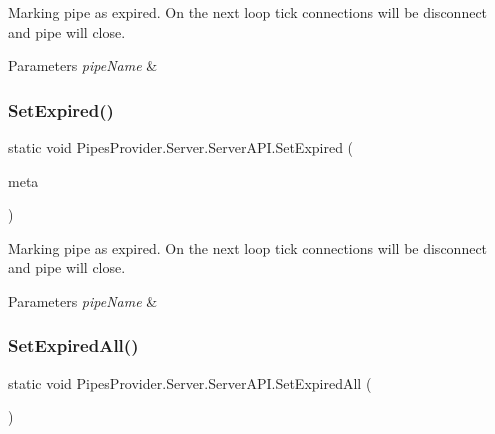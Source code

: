 Marking pipe as expired. On the next loop tick connections will be disconnect and pipe will close. 


\begin{DoxyParams}{Parameters}
{\em pipe\+Name} & \\
\hline
\end{DoxyParams}
\mbox{\label{class_pipes_provider_1_1_server_1_1_server_a_p_i_a9adcab99d6a6b7e4185203afb74dc575}} 
\subsubsection{\texorpdfstring{Set\+Expired()}{SetExpired()}\hspace{0.1cm}{\footnotesize\ttfamily [2/2]}}
{\footnotesize\ttfamily static void Pipes\+Provider.\+Server.\+Server\+A\+P\+I.\+Set\+Expired (\begin{DoxyParamCaption}\item[{\mbox{\hyperlink{class_pipes_provider_1_1_server_1_1_transmission_controllers_1_1_base_server_transmission_controller}{Base\+Server\+Transmission\+Controller}}}]{meta }\end{DoxyParamCaption})\hspace{0.3cm}{\ttfamily [static]}}



Marking pipe as expired. On the next loop tick connections will be disconnect and pipe will close. 


\begin{DoxyParams}{Parameters}
{\em pipe\+Name} & \\
\hline
\end{DoxyParams}
\mbox{\label{class_pipes_provider_1_1_server_1_1_server_a_p_i_a6d6f42c39e7f5c8a63a026739fe0ea94}} 
\subsubsection{\texorpdfstring{Set\+Expired\+All()}{SetExpiredAll()}}
{\footnotesize\ttfamily static void Pipes\+Provider.\+Server.\+Server\+A\+P\+I.\+Set\+Expired\+All (\begin{DoxyParamCaption}{ }\end{DoxyParamCaption})\hspace{0.3cm}{\ttfamily [static]}}



